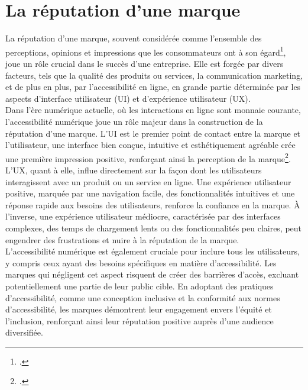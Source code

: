 \documentclass[12pt, a4paper]{report}
\begin{document}
\section{La réputation d'une marque}

La réputation d'une marque, souvent considérée comme l'ensemble des perceptions, opinions et impressions que les consommateurs ont à son égard\footcite{boistel_reputation_2008}, joue un rôle crucial dans le succès d'une entreprise. Elle est forgée par divers facteurs, tels que la qualité des produits ou services, la communication marketing, et de plus en plus, par l'accessibilité en ligne, en grande partie déterminée par les aspects d'interface utilisateur (UI) et d'expérience utilisateur (UX).\\

Dans l'ère numérique actuelle, où les interactions en ligne sont monnaie courante, l'accessibilité numérique joue un rôle majeur dans la construction de la réputation d'une marque. L'UI est le premier point de contact entre la marque et l'utilisateur, une interface bien conçue, intuitive et esthétiquement agréable crée une première impression positive, renforçant ainsi la perception de la marque\footcite{barcella_initiation_nodate}.\\

L'UX, quant à elle, influe directement sur la façon dont les utilisateurs interagissent avec un produit ou un service en ligne. Une expérience utilisateur positive, marquée par une navigation facile, des fonctionnalités intuitives et une réponse rapide aux besoins des utilisateurs, renforce la confiance en la marque. À l'inverse, une expérience utilisateur médiocre, caractérisée par des interfaces complexes, des temps de chargement lents ou des fonctionnalités peu claires, peut engendrer des frustrations et nuire à la réputation de la marque.\\

L'accessibilité numérique est également cruciale pour inclure tous les utilisateurs, y compris ceux ayant des besoins spécifiques en matière d'accessibilité. Les marques qui négligent cet aspect risquent de créer des barrières d'accès, excluant potentiellement une partie de leur public cible. En adoptant des pratiques d'accessibilité, comme une conception inclusive et la conformité aux normes d'accessibilité, les marques démontrent leur engagement envers l'équité et l'inclusion, renforçant ainsi leur réputation positive auprès d'une audience diversifiée.\\
\end{document}
